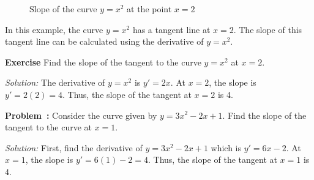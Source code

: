 \documentclass[a4paper,12pt]{book}
\newenvironment{exercise}[1][]
  {\par\medskip\noindent\textbf{Exercise #1} \rmfamily}
  {\medskip}
\newcounter{problem}
\newenvironment{problem}[1][\theproblem]
{\refstepcounter{problem}\par\medskip\noindent\textbf{Problem~#1:} \rmfamily}{\medskip}
\newenvironment{solution}[1][]
{\par\noindent\textit{Solution:} \rmfamily}{\medskip}
\newcounter{example}
\begin{document}
\begin{figure}[H]
\centering
{}
\caption{Slope of the curve \(y = x^2\) at the point \(x=2\)}
\end{figure}

In this example, the curve \(y = x^2\) has a tangent line at \(x=2\). The slope of this tangent line can be calculated using the derivative of \(y = x^2\).

\begin{exercise}
Find the slope of the tangent to the curve \(y = x^2\) at \(x=2\).
\end{exercise}

\begin{solution}
The derivative of \(y = x^2\) is \(y' = 2x\). At \(x=2\), the slope is \(y' = 2(2) = 4\). Thus, the slope of the tangent at \(x=2\) is 4.
\end{solution}





\begin{problem}
Consider the curve given by \( y = 3x^2 - 2x + 1 \). Find the slope of the tangent to the curve at \( x = 1 \).
\end{problem}

\begin{solution}
First, find the derivative of \( y = 3x^2 - 2x + 1 \) which is \( y' = 6x - 2 \). At \( x = 1 \), the slope is \( y' = 6(1) - 2 = 4 \). Thus, the slope of the tangent at \( x = 1 \) is 4.
\end{solution}
\end{document}
